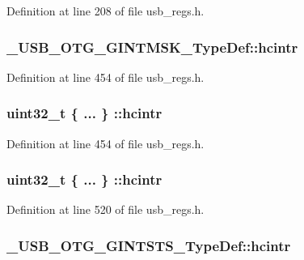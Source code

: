 Definition at line 208 of file usb\-\_\-regs.\-h.

\hypertarget{group___u_s_b___o_t_g___d_r_i_v_e_r_ga6a68f8b28d6fb5337fa58e292bc19493}{
\subsubsection[{hcintr}]{ \-\_\-\-U\-S\-B\-\_\-\-O\-T\-G\-\_\-\-G\-I\-N\-T\-M\-S\-K\-\_\-\-Type\-Def\-::hcintr}}\label{group___u_s_b___o_t_g___d_r_i_v_e_r_ga6a68f8b28d6fb5337fa58e292bc19493}


Definition at line 454 of file usb\-\_\-regs.\-h.

\hypertarget{group___u_s_b___o_t_g___d_r_i_v_e_r_ga04157833d9552e2267ebd75dd201029e}{
\subsubsection[{hcintr}]{\setlength{\rightskip}{0pt plus 5cm}uint32\-\_\-t \{ ... \} \-::hcintr}}\label{group___u_s_b___o_t_g___d_r_i_v_e_r_ga04157833d9552e2267ebd75dd201029e}


Definition at line 454 of file usb\-\_\-regs.\-h.

\hypertarget{group___u_s_b___o_t_g___d_r_i_v_e_r_ga75e2b57ecc2f4af84b1c29893a821945}{
\subsubsection[{hcintr}]{\setlength{\rightskip}{0pt plus 5cm}uint32\-\_\-t \{ ... \} \-::hcintr}}\label{group___u_s_b___o_t_g___d_r_i_v_e_r_ga75e2b57ecc2f4af84b1c29893a821945}


Definition at line 520 of file usb\-\_\-regs.\-h.

\hypertarget{group___u_s_b___o_t_g___d_r_i_v_e_r_gaf650d15c5ad75174f2f207185162658b}{
\subsubsection[{hcintr}]{ \-\_\-\-U\-S\-B\-\_\-\-O\-T\-G\-\_\-\-G\-I\-N\-T\-S\-T\-S\-\_\-\-Type\-Def\-::hcintr}}\label{group___u_s_b___o_t_g___d_r_i_v_e_r_gaf650d15c5ad75174f2f207185162658b}


